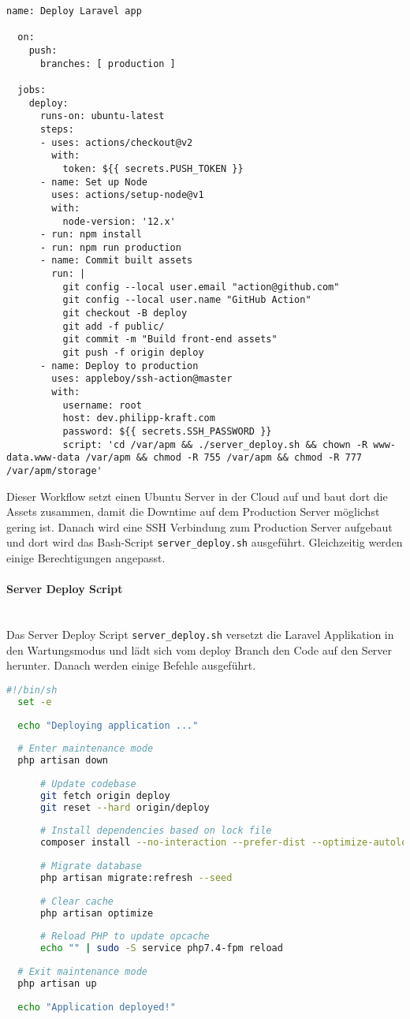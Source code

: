\begin{lstlisting}[caption={phpmyadmin.conf}]
  name: Deploy Laravel app

  on:
    push:
      branches: [ production ]
  
  jobs:
    deploy:
      runs-on: ubuntu-latest
      steps:
      - uses: actions/checkout@v2
        with:
          token: ${{ secrets.PUSH_TOKEN }}
      - name: Set up Node
        uses: actions/setup-node@v1
        with:
          node-version: '12.x'
      - run: npm install
      - run: npm run production
      - name: Commit built assets
        run: |
          git config --local user.email "action@github.com"
          git config --local user.name "GitHub Action"
          git checkout -B deploy
          git add -f public/
          git commit -m "Build front-end assets"
          git push -f origin deploy
      - name: Deploy to production
        uses: appleboy/ssh-action@master
        with:
          username: root
          host: dev.philipp-kraft.com
          password: ${{ secrets.SSH_PASSWORD }}
          script: 'cd /var/apm && ./server_deploy.sh && chown -R www-data.www-data /var/apm && chmod -R 755 /var/apm && chmod -R 777 /var/apm/storage' 
\end{lstlisting}

Dieser Workflow setzt einen Ubuntu Server in der Cloud auf und baut dort die Assets zusammen, damit die Downtime auf dem Production Server möglichst gering ist. Danach wird eine SSH Verbindung zum Production Server aufgebaut und dort wird das Bash-Script \verb|server_deploy.sh| ausgeführt. Gleichzeitig werden einige Berechtigungen angepasst.

\paragraph{Server Deploy Script}\mbox{}\\

Das Server Deploy Script \verb|server_deploy.sh| versetzt die Laravel Applikation in den Wartungsmodus und lädt sich vom deploy Branch den Code auf den Server herunter. Danach werden einige Befehle ausgeführt.

\begin{lstlisting}[language=bash, caption={phpmyadmin.conf}]
  #!/bin/sh
  set -e
  
  echo "Deploying application ..."
  
  # Enter maintenance mode
  php artisan down
      
      # Update codebase
      git fetch origin deploy
      git reset --hard origin/deploy
  
      # Install dependencies based on lock file
      composer install --no-interaction --prefer-dist --optimize-autoloader
  
      # Migrate database
      php artisan migrate:refresh --seed
  
      # Clear cache
      php artisan optimize
      
      # Reload PHP to update opcache
      echo "" | sudo -S service php7.4-fpm reload
  
  # Exit maintenance mode
  php artisan up
  
  echo "Application deployed!"
\end{lstlisting}
